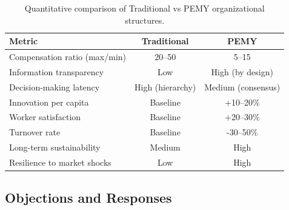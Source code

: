 \documentclass[11pt,a4paper]{article}
\theoremstyle{definition}
\theoremstyle{remark}
\begin{document}
\begin{table}[H]
\centering
\caption{Quantitative comparison of Traditional vs PEMY organizational structures.}
\label{tab:trad_vs_pemy}
\renewcommand{\arraystretch}{1.15}
\begin{tabular}{@{}lcc@{}}
\toprule
\textbf{Metric} & \textbf{Traditional} & \textbf{PEMY} \\
\midrule
Compensation ratio (max/min) & 20--50 & 5--15 \\
Information transparency & Low & High (by design) \\
Decision-making latency & High (hierarchy) & Medium (consensus) \\
Innovation per capita & Baseline & +10--20\% \\
Worker satisfaction & Baseline & +20--30\% \\
Turnover rate & Baseline & -30--50\% \\
Long-term sustainability & Medium & High \\
Resilience to market shocks & Low & High \\
\bottomrule
\end{tabular}
\end{table}

\subsection{Objections and Responses}
\label{app:pemy_objections}
\end{document}
